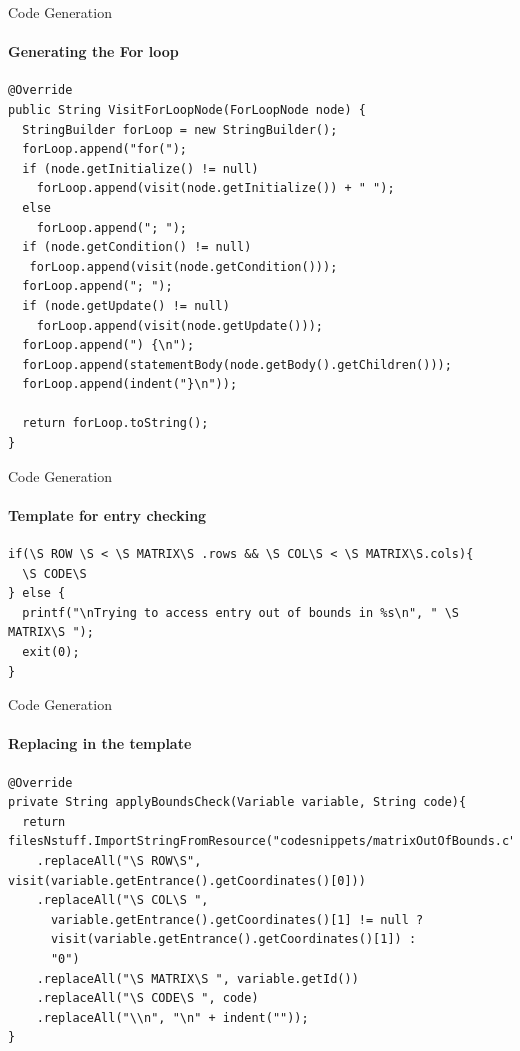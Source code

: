 \begin{frame}[fragile]{Code Generation}
\framesubtitle{Generating the For loop}

\begin{lstlisting}[caption=The visit method called generating code for the for loop.,frame=tlrb, basicstyle=\tiny, numbers=none]
@Override
public String VisitForLoopNode(ForLoopNode node) {
  StringBuilder forLoop = new StringBuilder();
  forLoop.append("for(");
  if (node.getInitialize() != null)
    forLoop.append(visit(node.getInitialize()) + " ");
  else
    forLoop.append("; ");
  if (node.getCondition() != null)
   forLoop.append(visit(node.getCondition()));
  forLoop.append("; ");
  if (node.getUpdate() != null)
    forLoop.append(visit(node.getUpdate()));
  forLoop.append(") {\n");
  forLoop.append(statementBody(node.getBody().getChildren()));
  forLoop.append(indent("}\n"));

  return forLoop.toString();
}

\end{lstlisting}

\end{frame}

\begin{frame}[fragile]{Code Generation}
\framesubtitle{Template for entry checking}
\begin{lstlisting}[caption=The template for checking if an entry is out of bounds in a matrix.,frame=tlrb, basicstyle=\tiny, numbers=none]
if(\S ROW \S < \S MATRIX\S .rows && \S COL\S < \S MATRIX\S.cols){
  \S CODE\S
} else {
  printf("\nTrying to access entry out of bounds in %s\n", " \S MATRIX\S ");
  exit(0);
}

\end{lstlisting}

\end{frame}


\begin{frame}[fragile]{Code Generation}
\framesubtitle{Replacing in the template}
\begin{lstlisting}[caption=The visit method called generating code for the for loop.,frame=tlrb, basicstyle=\tiny, numbers=none]
@Override
private String applyBoundsCheck(Variable variable, String code){
  return filesNstuff.ImportStringFromResource("codesnippets/matrixOutOfBounds.c")
    .replaceAll("\S ROW\S", visit(variable.getEntrance().getCoordinates()[0]))
    .replaceAll("\S COL\S ",
      variable.getEntrance().getCoordinates()[1] != null ?
      visit(variable.getEntrance().getCoordinates()[1]) :
      "0")
    .replaceAll("\S MATRIX\S ", variable.getId())
    .replaceAll("\S CODE\S ", code)
    .replaceAll("\\n", "\n" + indent(""));
}

\end{lstlisting}

\end{frame}







